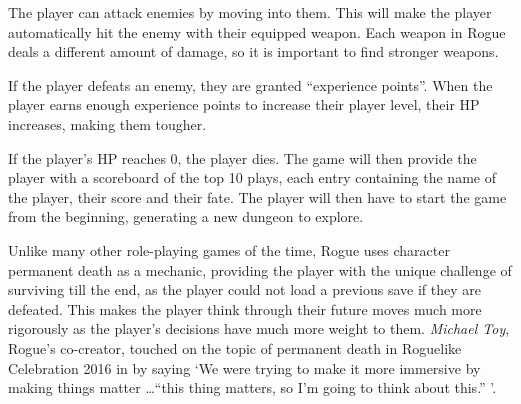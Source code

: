 \documentclass[12pt,a4paper]{article}
\begin{document}
    The player can attack enemies by moving into them.
    This will make the player automatically hit the enemy with their equipped weapon.
    Each weapon in Rogue deals a different amount of damage, so it is important to find stronger weapons.

    If the player defeats an enemy, they are granted ``experience points''.
    When the player earns enough experience points to increase their player level, their HP increases, making them tougher.

    If the player's HP reaches 0, the player dies.
    The game will then provide the player with a scoreboard of the top 10 plays, each entry containing the name of the player, their score and their fate.
    The player will then have to start the game from the beginning, generating a new dungeon to explore.

    Unlike many other role-playing games of the time, Rogue uses character permanent death as a mechanic, providing the player with
    the unique challenge of surviving till the end, as the player could not load a previous save if they are defeated.
    This makes the player think through their future moves much more rigorously as the player's decisions have much more weight to them.
    \emph{Michael Toy}, Rogue's co-creator, touched on the topic of permanent death in Roguelike Celebration 2016 in \citet{gamasutra16} by saying `We were trying to make it more immersive by making things matter \ldots ``this thing matters, so I'm going to think about this.'' '.



\end{document}

